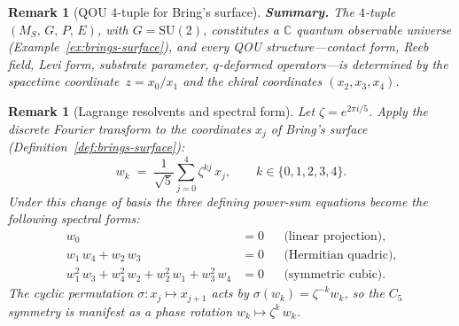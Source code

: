 \documentclass[12pt,a4paper]{report}
\newtheorem{remark}[theorem]{Remark}
\begin{document}
\begin{remark}[QOU $4$-tuple for Bring's surface]
\medskip
\noindent\textbf{Summary.}\;
The $4$-tuple $(M_S,\, G,\, P,\, E)$, with $G = \mathrm{SU}(2)$,
constitutes a $\mathbb{C}$ quantum observable universe
(Example~\ref{ex:brings-surface}), and every QOU structure---contact
form, Reeb field, Levi form, substrate parameter, $q$-deformed
operators---is determined by the spacetime coordinate~$z = x_0/x_1$ and
the chiral coordinates $(x_2, x_3, x_4)$.
\end{remark}

\begin{remark}[Lagrange resolvents and spectral form]
\label{rem:lagrange-resolvents}
Let $\zeta=e^{2\pi i/5}$.  Apply the discrete Fourier transform to the
coordinates $x_j$ of Bring's surface
(Definition~\ref{def:brings-surface}):
\[
  w_k \;=\; \frac{1}{\sqrt{5}}\sum_{j=0}^{4}\zeta^{kj}\,x_j,
  \qquad k\in\{0,1,2,3,4\}.
\]
Under this change of basis the three defining power-sum equations become the
following \emph{spectral forms}:
\begin{align}
  w_0 &= 0
    &&\text{(linear projection),}
    \label{eq:resolvent-linear}\\[4pt]
  w_1\,w_4+w_2\,w_3 &= 0
    &&\text{(Hermitian quadric),}
    \label{eq:resolvent-quadric}\\[4pt]
  w_1^2\,w_3+w_4^2\,w_2+w_2^2\,w_1+w_3^2\,w_4 &= 0
    &&\text{(symmetric cubic).}
    \label{eq:resolvent-cubic}
\end{align}
The cyclic permutation $\sigma\colon x_j\mapsto x_{j+1}$ acts by
$\sigma(w_k)=\zeta^{-k}w_k$, so the $C_5$ symmetry is manifest as a phase
rotation $w_k\mapsto\zeta^k\,w_k$.
\end{remark}
\end{document}
